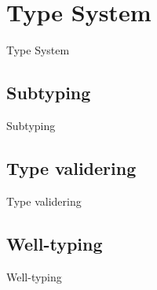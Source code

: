 \section{Type System}
\begin{frame}{Type System}

\end{frame}

\subsection{Subtyping}
\begin{frame}{Subtyping}

\end{frame}

\subsection{Type validering}
\begin{frame}{Type validering}

\end{frame}

\subsection{Well-typing}
\begin{frame}{Well-typing}

\end{frame}



